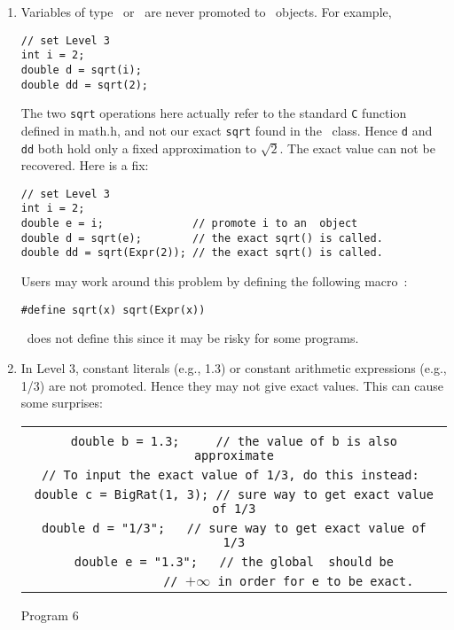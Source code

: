 \documentclass[12pt]{article}
\begin{document}
\begin{enumerate}
\item
Variables of type \int\ or \float\ are never
promoted to \expr\ objects. For example,

\begin{progb}{
\> \tt // set Level 3\\
\> \tt int i = 2;\\
\> \tt double d = sqrt(i); \\
\> \tt double dd = sqrt(2); 
}\end{progb}
\noindent
The two {\tt sqrt} operations here actually refer to the 
standard {\tt C} function defined in math.h, and not
our exact {\tt sqrt} found in the \expr\ class. 
Hence {\tt d} and {\tt dd} both hold only a 
fixed approximation to $\sqrt{2}$.  The exact value can not be recovered.
Here is a fix:

\begin{progb} {
\> \tt // set Level 3\\
\> \tt int i = 2;\\
\> \tt double e = i; \ \ \ \ \ \ \ \ \ \ \ \ \ // promote i to an \expr\ object\\
\> \tt double d = sqrt(e); \ \ \ \ \ \ \ // the exact sqrt() is called.\\
\> \tt double dd = sqrt(Expr(2)); // the exact sqrt() is called.
}\end{progb}

Users may work around this problem by defining the following macro~:

\begin{progb} {
\> \tt \#define sqrt(x) sqrt(Expr(x))
}\end{progb}

\core\ does not define this since it may be risky for some programs.

\item
In Level 3, constant literals (e.g., 1.3) or constant arithmetic expressions
(e.g., 1/3) are not promoted.   Hence they may not
give exact values.  This can cause some surprises:
 
\begin{center}
\begin{tabular}{c}
\begin{progb} {
\> \tt double a = 1.0/3; \ \ // the value of a is an approximation to 1/3\\
\> \tt double b = 1.3; \ \ \ \ // the value of b is also approximate\\
\> \tt // To input the exact value of 1/3, do this instead: \\
\> \tt double c = BigRat(1, 3); // sure way to get exact value of 1/3\\
\> \tt double d = "1/3"; \ \ // sure way to get exact value of 1/3\\
\> \tt double e = "1.3"; \ \ // the global \ should be\\
\>\>\tt \ \ \ \ \ \ \ \ \ \ \ \ \ \ \ \ // $+\infty$ in order for e to be exact.
}\end{progb}
\end{tabular}
	Program 6
\end{center}


\end{enumerate}
\end{document}
